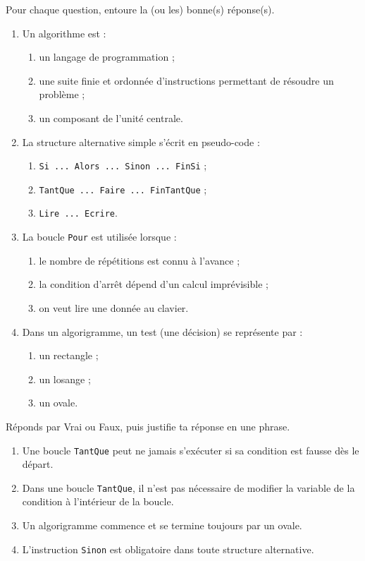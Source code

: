 \documentclass[11pt]{article}
\begin{document}
\begin{exercice}
Pour chaque question, entoure la (ou les) bonne(s) réponse(s).
\begin{enumerate}
\item Un algorithme est :
\begin{enumerate}
\item un langage de programmation ;
\item une suite finie et ordonnée d'instructions permettant de résoudre un problème ;
\item un composant de l'unité centrale.
\end{enumerate}
\item La structure alternative simple s'écrit en pseudo-code :
\begin{enumerate}
\item \texttt{Si ... Alors ... Sinon ... FinSi} ;
\item \texttt{TantQue ... Faire ... FinTantQue} ;
\item \texttt{Lire ... Ecrire}.
\end{enumerate}
\item La boucle \texttt{Pour} est utilisée lorsque :
\begin{enumerate}
\item le nombre de répétitions est connu à l'avance ;
\item la condition d'arrêt dépend d'un calcul imprévisible ;
\item on veut lire une donnée au clavier.
\end{enumerate}
\item Dans un algorigramme, un test (une décision) se représente par :
\begin{enumerate}
\item un rectangle ;
\item un losange ;
\item un ovale.
\end{enumerate}
\end{enumerate}
\end{exercice}

\begin{exercice}
Réponds par Vrai ou Faux, puis justifie ta réponse en une phrase.
\begin{enumerate}
\item Une boucle \texttt{TantQue} peut ne jamais s'exécuter si sa condition est fausse dès le départ.
\item Dans une boucle \texttt{TantQue}, il n'est pas nécessaire de modifier la variable de la condition à l'intérieur de la boucle.
\item Un algorigramme commence et se termine toujours par un ovale.
\item L'instruction \texttt{Sinon} est obligatoire dans toute structure alternative.
\end{enumerate}
\end{exercice}
\end{document}
